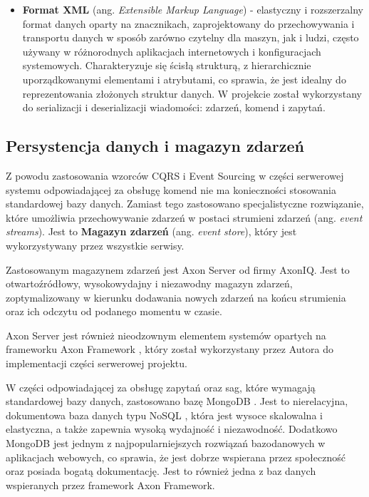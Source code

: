 \begin{itemize}
    \item \textbf{Format XML} (ang. \textit{Extensible Markup Language}) - elastyczny i rozszerzalny format danych oparty na znacznikach, zaprojektowany do przechowywania i transportu danych w sposób zarówno czytelny dla maszyn, jak i ludzi, często używany w różnorodnych aplikacjach internetowych i konfiguracjach systemowych. Charakteryzuje się ścisłą strukturą, z hierarchicznie uporządkowanymi elementami i atrybutami, co sprawia, że jest idealny do reprezentowania złożonych struktur danych. W projekcie został wykorzystany do serializacji i deserializacji wiadomości: zdarzeń, komend i zapytań.

\end{itemize}

\clearpage

\subsection{Persystencja danych i magazyn zdarzeń}

Z powodu zastosowania wzorców CQRS i Event Sourcing w części serwerowej systemu odpowiadającej za obsługę komend nie ma konieczności stosowania standardowej bazy danych. Zamiast tego zastosowano specjalistyczne rozwiązanie, które umożliwia przechowywanie zdarzeń w postaci strumieni zdarzeń (ang. \textit{event streams}). Jest to \textbf{Magazyn zdarzeń} (ang. \textit{event store}), który jest wykorzystywany przez wszystkie serwisy.

Zastosowanym magazynem zdarzeń jest Axon Server \cite{axonserver} od firmy AxonIQ. Jest to otwartoźródłowy, wysokowydajny i niezawodny magazyn zdarzeń, zoptymalizowany w kierunku dodawania nowych zdarzeń na końcu strumienia oraz ich odczytu od podanego momentu w czasie.

Axon Server jest również nieodzownym elementem systemów opartych na frameworku Axon Framework \cite{axonframework}, który został wykorzystany przez Autora do implementacji części serwerowej projektu.

W części odpowiadającej za obsługę zapytań oraz sag, które wymagają standardowej bazy danych, zastosowano bazę MongoDB \cite{mongodb}. Jest to nierelacyjna, dokumentowa baza danych typu NoSQL \cite{nosql},  która jest wysoce skalowalna i elastyczna, a także zapewnia wysoką wydajność i niezawodność. Dodatkowo MongoDB jest jednym z najpopularniejszych rozwiązań bazodanowych w aplikacjach webowych, co sprawia, że jest dobrze wspierana przez społeczność oraz posiada bogatą dokumentację. Jest to również jedna z baz danych wspieranych przez framework Axon Framework.

